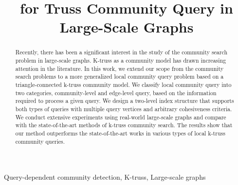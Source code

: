 \documentclass[conference]{IEEEtran}
\newcommand{\toplevelprob}{community-level}
\newcommand{\bottomlevelprob}{edge-level}
\newcommand{\twolevelindex}{two-level index}
\newcommand{\TwoLevelIndex}{\expandafter\capitalisewords\expandafter{\twolevelindex}}
\begin{document}
\title{\TwoLevelIndex{} for Truss Community Query in Large-Scale Graphs}

\author{
}

\maketitle

\begin{abstract}
Recently, there has been a significant interest in the study of the community search problem in large-scale graphs. K-truss as a community model has drawn increasing attention in the literature. In this work, we extend our scope from the community search problems to a more generalized local community query problem based on a triangle-connected k-truss community model. We classify local community query into two categories, \toplevelprob{} and \bottomlevelprob{} query, based on the information required to process a given query. 
We design a two-level index structure that supports both types of queries with multiple query vertices and arbitrary cohesiveness criteria. 
We conduct extensive experiments using real-world large-scale graphs and compare with the state-of-the-art methods of k-truss community search. The results show that our method outperforms the state-of-the-art works in various types of local k-truss community queries. 
\end{abstract}

\begin{IEEEkeywords}
Query-dependent community detection, K-truss, Large-scale graphs
\end{IEEEkeywords}











%
\end{document}
